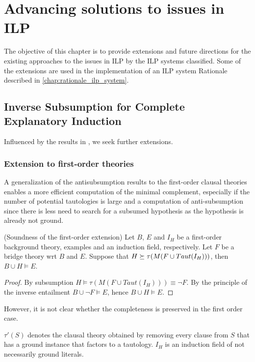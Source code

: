\chapter{Advancing solutions to issues in ILP}\label{chap:advancing_solutions_to_issues_in_ilp}
The objective of this chapter is to provide extensions and future directions for the existing approaches to the issues in ILP by the ILP systems classified. Some of the extensions are used in the implementation of an ILP system Rationale described in \autoref{chap:rationale_ilp_system}.

\section{Inverse Subsumption for Complete Explanatory Induction}\cite{yamamoto2012inverse}
Influenced by the results in \cite{yamamoto2012inverse}, we seek further extensions.

\subsection{Extension to first-order theories}
A generalization of the antisubsumption results to the first-order clausal theories enables a more efficient computation of the minimal complement, especially if the number of potential tautologies is large and a computation of anti-subsumption since there is less need to search for a subsumed hypothesis as the hypothesis is already not ground.

\begin{proposition}(Soundness of the first-order extension)
Let $B$, $E$ and $I_H$ be a first-order background theory, examples and an induction field, respectively. Let $F$ be a bridge theory wrt $B$ and $E$. Suppose that $H \succeq \tau(M(F \cup Taut(I_H)))$, then $B \cup H \models E$.
\end{proposition}
\begin{proof}
By subsumption $H \models \tau(M(F \cup Taut(I_H))) \equiv \neg F$. By the principle of the inverse entailment $B \cup \neg F \models E$, hence
$B \cup H \models E$.
\end{proof}

However, it is not clear whether the completeness is preserved in the first order case.

$\tau'(S)$ denotes the clausal theory obtained by removing every clause from $S$ that has a ground instance that factors to a tautology. $I_H$ is an induction field of not necessarily ground literals.

